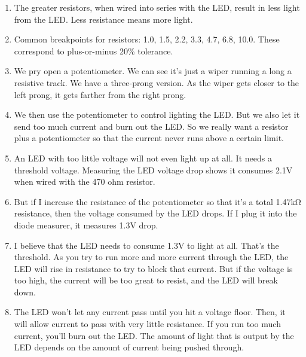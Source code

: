 \documentclass[11pt, oneside]{amsart}
\begin{document}
\begin{enumerate}
  \item The greater resistors, when wired into series with the LED,
  result in less light from the LED. Less resistance means more light.

  \item Common breakpoints for resistors: 1.0, 1.5, 2.2, 3.3, 4.7, 6.8,
  10.0. These correspond to plus-or-minus 20\% tolerance.

  \item We pry open a potentiometer. We can see it's just a wiper
  running a long a resistive track. We have a three-prong version. As
  the wiper gets closer to the left prong, it gets farther from the
  right prong.

  \item We then use the potentiometer to control lighting the LED. But
  we also let it send too much current and burn out the LED. So we
  really want a resistor plus a potentiometer so that the current never
  runs above a certain limit.

  \item An LED with too little voltage will not even light up at all. It
  needs a threshold voltage. Measuring the LED voltage drop shows it
  consumes 2.1V when wired with the 470 ohm resistor.

  \item But if I increase the resistance of the potentiometer so that
  it's a total 1.47kΩ resistance, then the voltage consumed by the LED
  drops. If I plug it into the diode measurer, it measures 1.3V drop.

  \item I believe that the LED needs to consume 1.3V to light at all.
  That's the threshold. As you try to run more and more current through
  the LED, the LED will rise in resistance to try to block that current.
  But if the voltage is too high, the current will be too great to
  resist, and the LED will break down.

  \item The LED won't let any current pass until you hit a voltage
  floor. Then, it will allow current to pass with very little
  resistance. If you run too much current, you'll burn out the LED. The
  amount of light that is output by the LED depends on the amount of
  current being pushed through.



\end{enumerate}
\end{document}

